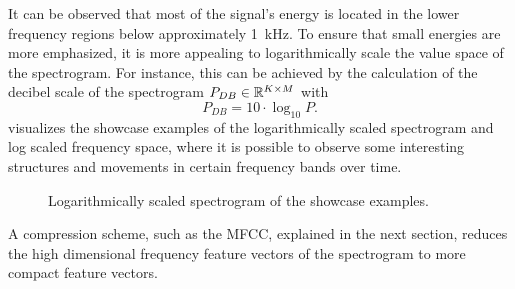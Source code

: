 \FloatBarrier
\noindent
It can be observed that most of the signal's energy is located in the lower frequency regions below approximately \SI{1}{\kilo\hertz}.
To ensure that small energies are more emphasized, it is more appealing to logarithmically scale the value space of the spectrogram.
For instance, this can be achieved by the calculation of the decibel scale of the spectrogram $P_{DB} \in \mathbb{R}^{K \times M}$ with
\begin{equation}\label{eq:signal_spec_log}
  P_{DB} = 10 \cdot \log_{10}{P}.
\end{equation}
 visualizes the showcase examples of the logarithmically scaled spectrogram and log scaled frequency space, where it is possible to observe some interesting structures and movements in certain frequency bands over time.
\begin{figure}[!ht]
  \centering
  \caption{Logarithmically scaled spectrogram of the showcase examples.}
  \label{fig:signal_spec_log_showcase}
\end{figure}
\FloatBarrier
\noindent
A compression scheme, such as the MFCC, explained in the next section, reduces the high dimensional frequency feature vectors of the spectrogram to more compact feature vectors.